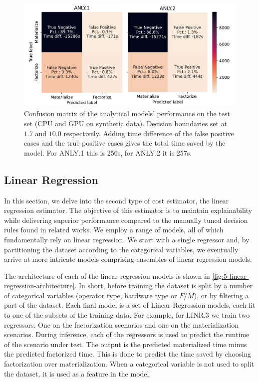 \begin{figure}[ht]
    \centering
    \includegraphics[width=0.9\linewidth]{chapters/05_cost_estimation/figures/analytical-models-compare.pdf}
    \caption[Analytical Model Confusion Matrix]{Confusion matrix of the analytical models' performance on the test set (CPU and GPU on synthetic data). Decision boundaries set at $1.7$ and $10.0$ respectively. Adding time difference of the false positive cases and the true positive cases gives the total time saved by the model. For ANLY.1 this is 256s, for ANLY.2 it is 257s. }
    \label{fig:5-analytical-model-evaluation}
\end{figure}


\subsection{Linear Regression}
\label{subsec:5-linear-regression}
In this section, we delve into the second type of cost estimator, the linear regression estimator. The objective of this estimator is to maintain explainability while delivering superior performance compared to the manually tuned decision rules found in related works. We employ a range of models, all of which fundamentally rely on linear regression. We start with a single regressor and, by partitioning the dataset according to the categorical variables, we eventually arrive at more intricate models comprising ensembles of linear regression models.

The architecture of each of the linear regression models is shown in \autoref{fig:5-linear-regression-architecture}. In short, before training the dataset is split by a number of categorical variables (operator type, hardware type or $F$/$M$), or by filtering a part of the dataset. Each final model is a set of Linear Regression models, each fit to one of the subsets of the training data. For example, for LINR.3 we train two regressors. One on the factorization scenarios and one on the materialization scenarios. During inference, each of the regressors is used to predict the runtime of the scenario under test. The output is the predicted materialized time minus the predicted factorized time. This is done to predict the time saved by choosing factorization over materialization. When a categorical variable is not used to split the dataset, it is used as a feature in the model.

